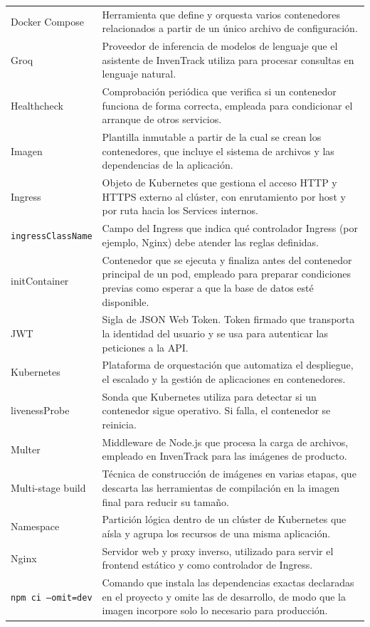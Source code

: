 \documentclass[stu,11pt,spanish,floatsintext]{apa7}
\begin{document}
\begin{longtable}{@{}p{}p{}@{}}
  Docker Compose & Herramienta que define y orquesta varios contenedores relacionados a partir de un único archivo de configuración. \\
  Groq & Proveedor de inferencia de modelos de lenguaje que el asistente de InvenTrack utiliza para procesar consultas en lenguaje natural. \\
  Healthcheck & Comprobación periódica que verifica si un contenedor funciona de forma correcta, empleada para condicionar el arranque de otros servicios. \\
  Imagen & Plantilla inmutable a partir de la cual se crean los contenedores, que incluye el sistema de archivos y las dependencias de la aplicación. \\
  Ingress & Objeto de Kubernetes que gestiona el acceso HTTP y HTTPS externo al clúster, con enrutamiento por host y por ruta hacia los Services internos. \\
  \texttt{ingressClassName} & Campo del Ingress que indica qué controlador Ingress (por ejemplo, Nginx) debe atender las reglas definidas. \\
  initContainer & Contenedor que se ejecuta y finaliza antes del contenedor principal de un pod, empleado para preparar condiciones previas como esperar a que la base de datos esté disponible. \\
  JWT & Sigla de JSON Web Token. Token firmado que transporta la identidad del usuario y se usa para autenticar las peticiones a la API. \\
  Kubernetes & Plataforma de orquestación que automatiza el despliegue, el escalado y la gestión de aplicaciones en contenedores. \\
  livenessProbe & Sonda que Kubernetes utiliza para detectar si un contenedor sigue operativo. Si falla, el contenedor se reinicia. \\
  Multer & Middleware de Node.js que procesa la carga de archivos, empleado en InvenTrack para las imágenes de producto. \\
  Multi-stage build & Técnica de construcción de imágenes en varias etapas, que descarta las herramientas de compilación en la imagen final para reducir su tamaño. \\
  Namespace & Partición lógica dentro de un clúster de Kubernetes que aísla y agrupa los recursos de una misma aplicación. \\
  Nginx & Servidor web y proxy inverso, utilizado para servir el frontend estático y como controlador de Ingress. \\
  \texttt{npm ci --omit=dev} & Comando que instala las dependencias exactas declaradas en el proyecto y omite las de desarrollo, de modo que la imagen incorpore solo lo necesario para producción. \\

\end{longtable}
\end{document}

